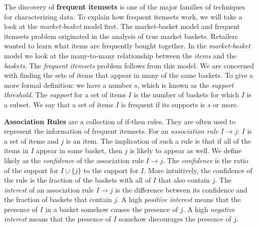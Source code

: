 \documentclass[../essay.tex]{subfiles}
\begin{document}
The discovery of \textbf{frequent itemsets} is one of the major families of techniques for characterizing data.
To explain how frequent itemsets work, we will take a look at the \emph{market-basket} model first.
The market-basket model and frequent itemsets problem originated in the analysis of true market baskets.
Retailers wanted to learn what items are frequently bought together.
In the \emph{market-basket} model we look at the many-to-many relationship between the \emph{items} and the \emph{baskets}.
The \emph{frequent itemsets} problem follows from this model.
We are concerned with finding the sets of items that appear in many of the same baskets.
To give a more formal definition: we have a number $s$, which is known as the \emph{support threshold}.
The \emph{support} for a set of items $I$ is the number of baskets for which $I$ is a subset.
We say that a set of items $I$ is frequent if its supports is $s$ or more.

\textbf{Association Rules} are a collection of if-then rules.
They are often used to represent the information of frequent itemsets.
For an \emph{association rule} $I \to j$: $I$ is a set of items and $j$ is an item.
The implication of such a rule is that if all of the items in $I$ appear in some basket, then $j$ is likely to appear as well.
We define likely as the \emph{confidence} of the association rule $I \to j$.
The \emph{confidence} is the ratio of the support for $I \cup \{j\}$ to the support for $I$.
More intuitively, the confidence of the rule is the fraction of the baskets with all of $I$ that also contain $j$.
The \emph{interest} of an association rule $I \to j$ is the difference between its confidence and the fraction of baskets that contain $j$.
A high \emph{positive interest} means that the presence of $I$ in a basket somehow causes the presence of $j$.
A high \emph{negative interest} means that the presence of $I$ somehow discourages the presence of $j$.
\end{document}

